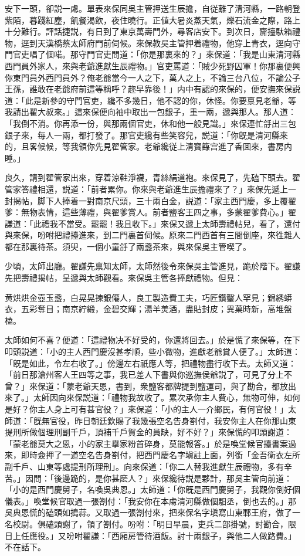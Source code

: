 安下一頭，卻説一䖏。單表來保同吳主管押送生辰擔，自従離了清河縣，一路朝登紫陌，暮踐紅塵，飢餐渴飲，夜住曉行。正値大暑炎蒸天氣，爍石流金之際，路上十分難行。評話捷説，有日到了東京萬壽門外，尋客店安下。到次日，齎擡馱箱禮物，逕到天漢橋蔡太師府門前伺候。來保教吳主管押着禮物，他穿上青衣，逕向守門官吏唱了個喏。那守門官吏問道：「你是那裏來的？」來保道：「我是山東清河縣西門員外家人，來與老爺進獻生辰禮物。」官吏罵道：「賊少死野囚軍！你那裏便興你東門員外西門員外？俺老爺當今一人之下，萬人之上，不論三台八位，不論公子王孫，誰敢在老爺府前這等稱呼？趂早靠後！」内中有認的來保的，便安撫來保説道：「此是新參的守門官吏，纔不多幾日，他不認的你，休怪。你要禀見老爺，等我請出翟大叔來。」這來保便向袖中取出一包銀子，重一兩，遞與那人。那人道：「我倒不消。你再添一份，與那兩個官吏，休和他一般見識。」來保連忙㧱出三包銀子來，每人一兩，都打發了。那官吏纔有些笑容兒，説道：「你旣是清河縣來的，且畧候候，等我領你先見翟管家。老爺纔従上清寳籙宫進了香囬來，書房内睡。」

良久，請到翟管家出來，穿着涼鞋淨襪，青絲絹道袍。來保見了，先磕下頭去。翟管家答禮相還，説道：「前者累你。你來與老爺進生辰擔禮來了？」來保先遞上一封揭帖，脚下人捧着一對南京尺頭，三十兩白金，説道：「家主西門慶，多上覆翟爹：無物表情，這些薄禮，與翟爹賞人。前者鹽客王四之事，多蒙翟爹費心。」翟謙道：「此禮我不當受。罷罷！我且收下。」來保又遞上太師壽禮帖兒，看了，還付與來保，吩咐把禮擡進來，到二門裏首伺候。原來二門西首有三間倒座，來徃雜人都在那裏待茶。須臾，一個小童㧱了兩盞茶來，與來保吳主管喫了。

少頃，太師出廳。翟謙先禀知太師，太師然後令來保吳主管進見，跪於階下。翟謙先把壽禮揭帖，呈遞與太師觀看。來保吳主管各捧獻禮物。但見：

\begin{myquote}
黄烘烘金壺玉盞，白晃晃揀銀僊人，良工製造費工夫，巧匠鑽鑿人罕見；錦綉蟒衣，五彩奪目；南京紵緞，金碧交輝；湯羊羙酒，盡貼封皮；異菓時新，高堆盤榼。
\end{myquote}

太師如何不喜？便道：「這禮物决不好受的，你還將回去。」於是慌了來保等，在下叩頭説道：「小的主人西門慶沒甚孝順，些小微物，進獻老爺賞人便了。」太師道：「旣是如此，令左右收了。」傍邊左右祇應人等，把禮物盡行收下去。太師又道：「前日那滄州客人王四等之事，我已差人下書與你巡撫侯爺説了，可見了分上不曾？」來保道：「蒙老爺天恩，書到，衆鹽客都牌提到鹽運司，與了勘合，都放出來了。」太師因向來保説道：「禮物我故收了。累次承你主人費心，無物可伸，如何是好？你主人身上可有甚官役？」來保道：「小的主人一介鄉民，有何官役！」太師道：「旣無官役，昨日朝廷欽賜了我幾張空名告身劄付，我安你主人在你那山東提刑所做個理刑副千戶，頂補千戶賀金的員缺，好不好？」來保慌的叩頭謝道：「蒙老爺莫大之恩，小的家主擧家粉首碎身，莫能報答。」於是喚堂候官擡書案過來，即時僉押了一道空名告身劄付，把西門慶名字塡註上面，列銜「金吾衛衣左所副千戶、山東等處提刑所理刑」。向來保道：「你二人替我進獻生辰禮物，多有辛苦。」因問：「後邊跪的，是你甚麽人？」來保纔待説是夥計，那吳主管向前道：「小的是西門慶舅子，名喚吳典恩。」太師道：「你旣是西門慶舅子，我觀你倒好個儀表。」喚堂候官取過一張劄付：「我安你在本䖏清河縣做個馹丞，倒也去的。」那吳典恩慌的磕頭如搗蒜。又取過一張劄付來，把來保名字塡寫山東鄆王府，做了一名校尉。俱磕頭謝了，領了劄付。吩咐：「明日早晨，吏兵二部掛號，討勘合，限日上任應役。」又吩咐翟謙：「西廂房管待酒飯。討十兩銀子，與他二人做路費。」不在話下。

